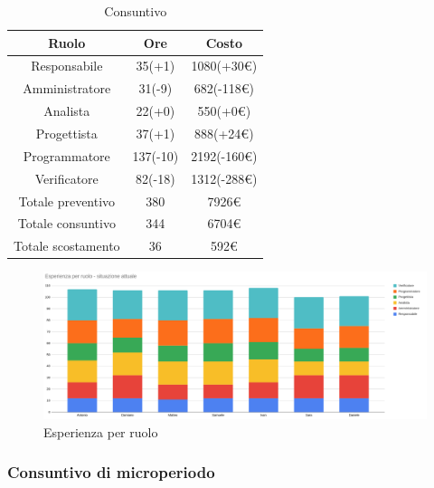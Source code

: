 \begin{table}[H]
	\centering
	\renewcommand{\arraystretch}{1.5}
	\begin{tabular}{|c|c|c|}
		\hline
		\rowcolor{lighter-grayer}
		Ruolo & Ore & Costo \\ \hline
		Responsabile & 35(+1) & 1080(+30\euro) \\ \hline
		Amministratore & 31(-9) & 682(-118\euro) \\ \hline
		Analista & 22(+0) & 550(+0\euro) \\ \hline
		Progettista & 37(+1) & 888(+24\euro) \\ \hline
		Programmatore & 137(-10) & 2192(-160\euro) \\ \hline
		Verificatore & 82(-18) & 1312(-288\euro) \\ \hline
		Totale preventivo & 380 & 7926\euro \\ \hline
		Totale consuntivo & 344 & 6704\euro \\ \hline
		Totale scostamento & 36 & 592\euro \\ \hline
	\end{tabular}
	\caption{ Consuntivo\\}
\end{table}

\begin{figure}[H]
	\centering
	\includegraphics[width=15cm]{res/images/GraficoRuoliDettaglioCodifica.png}
	\caption{ Esperienza per ruolo}
	\label{fig:Esperienza per ruolo}
\end{figure}

\subsubsection{Consuntivo di microperiodo}
